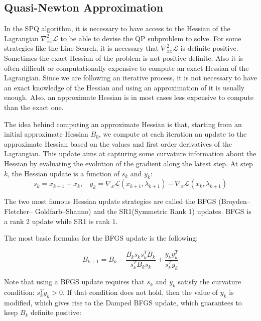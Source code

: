 \subsection{Quasi-Newton Approximation}
\label{sub:quasi_newton_approximation}

In the SPQ algorithm, it is necessary to have access to the Hessian of the Lagrangian $\nabla_{xx}^2\mathcal{L}$ to be able to devise the QP subproblem to solve.
For some strategies like the Line-Search, it is necessary that $\nabla_{xx}^2\mathcal{L}$ is definite positive.
Sometimes the exact Hessian of the problem is not positive definite.
Also it is often difficult or computationally expensive to compute an exact Hessian of the Lagrangian.
Since we are following an iterative process, it is not necessary to have an exact knowledge of the Hessian and using an approximation of it is usually enough.
Also, an approximate Hessian is in most cases less expensive to compute than the exact one.

The idea behind computing an approximate Hessian is that, starting from an initial approximate Hessian $B_0$, we compute at each iteration an update to the approximate Hessian based on the values and first order derivatives of the Lagrangian.
This update aims at capturing some curvature information about the Hessian by evaluating the evolution of the gradient along the latest step.
At step $k$, the Hessian update is a function of $s_k$ and $y_k$:
\begin{equation}
  s_k = x_{k+1}-x_k,\ \ \ \
  y_k = \nabla_x\mathcal{L}(x_{k+1}, \lambda_{k+1}) - \nabla_x\mathcal{L}(x_{k}, \lambda_{k+1})
\end{equation}

The two most famous Hessian update strategies are called the BFGS (Broyden–Fletcher– Goldfarb–Shanno) and the SR1(Symmetric Rank 1) updates.
BFGS is a rank 2 update while SR1 is rank 1.

The most basic formulas for the BFGS update is the following:

\begin{equation}
\label{BFGS}
  B_{k+1} = B_k - \frac{B_k s_k s_k^T B_k}{s_k^T B_k s_k} + \frac{y_k y_k^T}{s_k^T y_k}
\end{equation}

Note that using a BFGS update requires that $s_k$ and $y_k$ satisfy the curvature condition: $s_k^T y_k>0$.
If that condition does not hold, then the value of $y_k$ is modified, which gives rise to the Damped BFGS update, which guarantees to keep $B_k$ definite positive:

